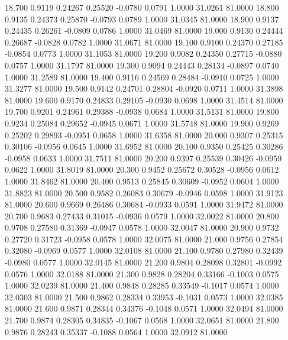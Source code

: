   18.700   0.9119   0.24267   0.25520  -0.0780   0.0791   1.0000  31.0261  81.0000
  18.800   0.9135   0.24373   0.25870  -0.0793   0.0789   1.0000  31.0345  81.0000
  18.900   0.9137   0.24435   0.26261  -0.0809   0.0786   1.0000  31.0469  81.0000
  19.000   0.9130   0.24444   0.26687  -0.0828   0.0782   1.0000  31.0671  81.0000
  19.100   0.9100   0.24370   0.27185  -0.0854   0.0773   1.0000  31.1053  81.0000
  19.200   0.9082   0.24350   0.27715  -0.0880   0.0757   1.0000  31.1797  81.0000
  19.300   0.9094   0.24443   0.28134  -0.0897   0.0740   1.0000  31.2589  81.0000
  19.400   0.9116   0.24569   0.28484  -0.0910   0.0725   1.0000  31.3277  81.0000
  19.500   0.9142   0.24701   0.28804  -0.0920   0.0711   1.0000  31.3898  81.0000
  19.600   0.9170   0.24833   0.29105  -0.0930   0.0698   1.0000  31.4514  81.0000
  19.700   0.9201   0.24961   0.29388  -0.0938   0.0684   1.0000  31.5131  81.0000
  19.800   0.9234   0.25084   0.29652  -0.0945   0.0671   1.0000  31.5748  81.0000
  19.900   0.9269   0.25202   0.29893  -0.0951   0.0658   1.0000  31.6358  81.0000
  20.000   0.9307   0.25315   0.30106  -0.0956   0.0645   1.0000  31.6952  81.0000
  20.100   0.9350   0.25425   0.30286  -0.0958   0.0633   1.0000  31.7511  81.0000
  20.200   0.9397   0.25539   0.30426  -0.0959   0.0622   1.0000  31.8019  81.0000
  20.300   0.9452   0.25672   0.30528  -0.0956   0.0612   1.0000  31.8462  81.0000
  20.400   0.9513   0.25845   0.30609  -0.0952   0.0604   1.0000  31.8823  81.0000
  20.500   0.9582   0.26083   0.30679  -0.0946   0.0598   1.0000  31.9123  81.0000
  20.600   0.9669   0.26486   0.30684  -0.0933   0.0591   1.0000  31.9472  81.0000
  20.700   0.9683   0.27433   0.31015  -0.0936   0.0579   1.0000  32.0022  81.0000
  20.800   0.9708   0.27580   0.31369  -0.0947   0.0578   1.0000  32.0047  81.0000
  20.900   0.9732   0.27720   0.31723  -0.0958   0.0578   1.0000  32.0075  81.0000
  21.000   0.9756   0.27854   0.32080  -0.0969   0.0577   1.0000  32.0108  81.0000
  21.100   0.9780   0.27980   0.32439  -0.0980   0.0577   1.0000  32.0145  81.0000
  21.200   0.9804   0.28098   0.32801  -0.0992   0.0576   1.0000  32.0188  81.0000
  21.300   0.9828   0.28204   0.33166  -0.1003   0.0575   1.0000  32.0239  81.0000
  21.400   0.9848   0.28285   0.33549  -0.1017   0.0574   1.0000  32.0303  81.0000
  21.500   0.9862   0.28334   0.33953  -0.1031   0.0573   1.0000  32.0385  81.0000
  21.600   0.9871   0.28344   0.34376  -0.1048   0.0571   1.0000  32.0494  81.0000
  21.700   0.9874   0.28305   0.34835  -0.1067   0.0568   1.0000  32.0651  81.0000
  21.800   0.9876   0.28243   0.35337  -0.1088   0.0564   1.0000  32.0912  81.0000
